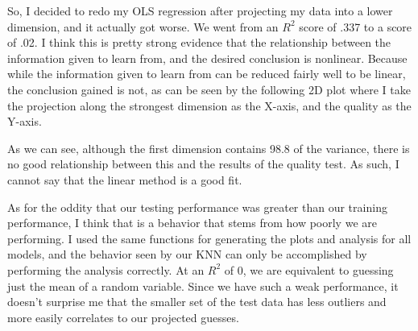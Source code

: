 \documentclass[12pt]{article}
\begin{document}
So, I decided to redo my OLS regression after projecting my data into a lower dimension, and it actually got worse.
We went from an $R^2$ score of .337 to a score of .02. I think this is pretty strong evidence that the relationship 
between the information given to learn from, and the desired conclusion is nonlinear. Because while the information 
given to learn from can be reduced fairly well to be linear, the conclusion gained is not, as can be seen by the 
following 2D plot where I take the projection along the strongest dimension as the X-axis, and the quality as the Y-axis.

As we can see, although the first dimension contains 98.8 of the variance, there is no good relationship between this and 
the results of the quality test. As such, I cannot say that the linear method is a good fit.

As for the oddity that our testing performance was greater than our training performance, I think that is a behavior that stems 
from how poorly we are performing. I used the same functions for generating the plots and analysis for all models, and the behavior 
seen by our KNN can only be accomplished by performing the analysis correctly. At an $R^2$ of 0, we are equivalent to 
guessing just the mean of a random variable. Since we have such a weak performance, it doesn't surprise me that the smaller
set of the test data has less outliers and more easily correlates to our projected guesses.
\end{document}
